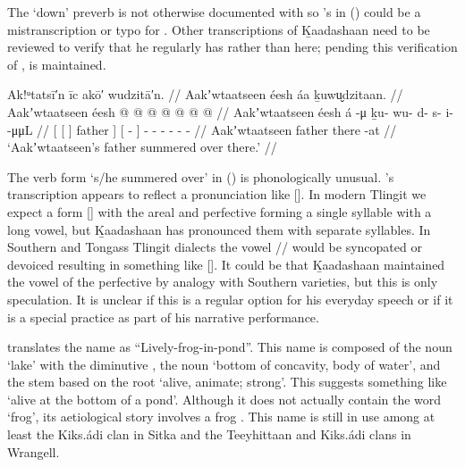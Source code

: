 The  ‘down’ preverb is not otherwise documented with  so \citeauthor{swanton:1911}’s  in (\lastx) could be a mistranscription or typo for .
Other transcriptions of Ḵaadashaan need to be reviewed to verify that he regularly has  rather than  here; pending this verification of ,  is maintained.

\ex\label{ex:100-2-father-summer-over}%
%
\begingl
	\glpreamble	Ak!ᵘtatsī′n īc akō′ wudzitā′n. //
	\glpreamble	Aakʼwtaatseen éesh áa ḵuwu̬dzitaan. //
	\gla	{} {} Aakʼwtaatseen {} éesh {}
			{}  @ {} {}
			 @ {} @ {} @ {} @ {} @ {} @ {} //
	\glb	{} {} Aakʼwtaatseen {} éesh {}
			{} á -μ {}
			ḵu- wu- d- s- i-  -μμL //
	\glc	{}[\pr{DP} {}[  {}] father {}]
			{}[  - {}]
			- - - - -  - //
	\gld	{} {} Aakʼwtaatseen {} father {}
			{} there -at {}
			 {} {} {} {} {} {} //
	\glft	‘Aakʼwtaatseen’s father summered over there.’
		//
\endgl
\xe

The verb form  ‘s/he summered over’ in (\lastx) is phonologically unusual.
\citeauthor{swanton:1909}’s transcription  appears to reflect a pronunciation like [].
In modern Tlingit we expect a form  [] with the areal  and perfective  forming a single syllable with a long vowel, but Ḵaadashaan has pronounced them with separate syllables.
In Southern and Tongass Tlingit dialects the vowel // would be syncopated or devoiced resulting in something like  [].
It could be that Ḵaadashaan maintained the vowel of the perfective by analogy with Southern varieties, but this is only speculation.
It is unclear if this is a regular option for his everyday speech or if it is a special practice as part of his narrative performance.

\citeauthor{swanton:1909} translates the name  as “Lively-frog-in-pond”.
This name is composed of the noun  ‘lake’ with the diminutive , the noun  ‘bottom of concavity, body of water’, and the stem  based on the root  ‘alive, animate; strong’.
This suggests something like ‘alive at the bottom of a pond’.
Although it does not actually contain the word  ‘frog’, its aetiological story involves a frog \parencites[224, 232–233, 294]{swanton:1909}[39, 45]{olson:1967}.
This name is still in use among at least the Kiks.ádi clan in Sitka and the Teeyhittaan and Kiks.ádi clans in Wrangell.

